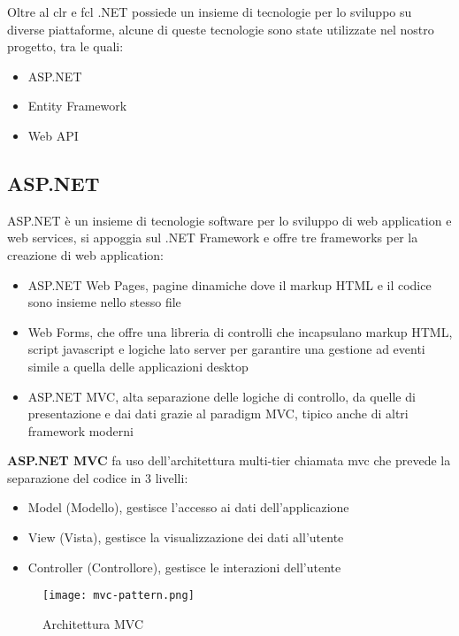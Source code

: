 Oltre al \Gls{clr} e \Gls{fcl} .NET possiede un insieme di tecnologie per lo sviluppo su diverse piattaforme, alcune di queste tecnologie sono state utilizzate nel nostro progetto, tra le quali:
\begin{itemize}
    \item ASP.NET
    \item Entity Framework
    \item Web API
\end{itemize}


\subsection{ASP.NET}

ASP.NET è un insieme di tecnologie software per lo sviluppo di web application e web services, si appoggia sul .NET Framework e offre tre frameworks per la creazione di web application: 
\begin{itemize}
	\item ASP.NET Web Pages, pagine dinamiche dove il markup HTML e il codice sono insieme nello stesso file
	\item Web Forms, che offre una libreria di controlli che incapsulano markup HTML, script javascript e logiche lato server per garantire una gestione ad eventi simile a quella delle applicazioni desktop
	\item ASP.NET MVC, alta separazione delle logiche di controllo, da quelle di presentazione e dai dati grazie al paradigm MVC, tipico anche di altri framework moderni
\end{itemize}

\textbf{ASP.NET MVC} \cite{mvc} fa uso dell'architettura multi-tier chiamata \Gls{mvc} che prevede la separazione del codice in 3 livelli:
\begin{itemize}
    \item Model (Modello), gestisce l'accesso ai dati dell'applicazione
    \item View (Vista), gestisce la visualizzazione dei dati all'utente
    \item Controller (Controllore), gestisce le interazioni dell'utente
\end{itemize}

\begin{figure}[H]
    \centering
    \texttt{[image: mvc-pattern.png]}
    \caption{Architettura MVC}
    \label{fig:Mvc}
\end{figure}

